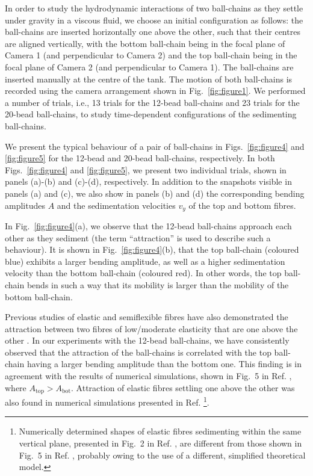 \documentclass{article}
\begin{document}
In order to study the hydrodynamic interactions of two ball-chains as they settle under gravity in a viscous fluid, %
we choose an initial configuration as follows: the ball-chains are inserted horizontally one above the other, such that their centres are aligned vertically, with the bottom ball-chain being in the focal plane of Camera 1 (and perpendicular to Camera 2) and the top ball-chain being in the focal plane of Camera 2 (and perpendicular to Camera 1). The ball-chains are inserted manually at the centre of the tank. The motion of both ball-chains is recorded using the camera arrangement shown in Fig.~\ref{fig:figure1}. We performed a %
number of trials, i.e., 13 trials for the 12-bead ball-chains and 23 trials for the 20-bead ball-chains, to study time-dependent %
configurations of the sedimenting ball-chains. 

We present the typical behaviour of a pair of ball-chains in Figs.~\ref{fig:figure4} and \ref{fig:figure5} for the 12-bead and 20-bead ball-chains, respectively. In both Figs.~\ref{fig:figure4} and \ref{fig:figure5}, we present two individual trials, shown in panels (a)-(b) and (c)-(d), respectively. In addition to the snapshots visible in panels (a) and (c), we also show in panels (b) and (d) the corresponding bending amplitudes $A$ and the sedimentation velocities $v_y$ of the top and bottom fibres. 


In Fig.~\ref{fig:figure4}(a), we observe that the 12-bead ball-chains approach  each other as they sediment (the term ``attraction” is used to describe such a behaviour). 
It is shown in Fig.~\ref{fig:figure4}(b), that the top ball-chain (coloured blue) exhibits a larger bending amplitude, as well as a higher sedimentation velocity than the bottom ball-chain (coloured red). In other words, the top ball-chain bends 
in such a way that its mobility is larger 
than the mobility of the bottom ball-chain. %

Previous studies of elastic and semiflexible fibres have also demonstrated the attraction between two fibres of low/moderate elasticity that are one above the other \cite{llopis2007sedimentation, saggiorato2015conformations}. In our experiments with the 12-bead ball-chains, we have consistently observed that the attraction of the ball-chains is %
correlated with the top ball-chain having a larger bending amplitude than the bottom one. This finding is in agreement with the results of numerical simulations, shown in Fig.~5 in Ref. \cite{saggiorato2015conformations}, where  $A_{\text{top}} > A_{\text{bot}}$. Attraction of elastic fibres settling one above the other was also found in numerical simulations presented in Ref. \cite{llopis2007sedimentation} 
\footnote[4]{
    Numerically determined shapes of elastic fibres sedimenting within the same vertical plane, presented in  Fig.~2 in Ref. \cite{llopis2007sedimentation}, are different from those shown in Fig.~5 in Ref. \cite{saggiorato2015conformations}, probably owing to the use of a different, simplified theoretical model.
}.
\end{document}
